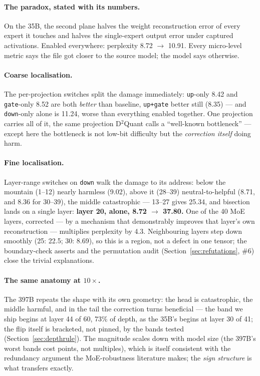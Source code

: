 \documentclass[10pt]{article} %
\begin{document}
\paragraph{The paradox, stated with its numbers.} On the 35B, the second plane halves
the weight reconstruction error of every expert it touches and halves the
single-expert output error under captured activations. Enabled everywhere:
perplexity 8.72 $\to$ 10.91. Every micro-level metric says the file got closer to
the source model; the model says otherwise.

\paragraph{Coarse localisation.} The per-projection switches split the damage
immediately: \texttt{up}-only 8.42 and \texttt{gate}-only 8.52 are both \emph{better} than
baseline, \texttt{up+gate} better still (8.35) --- and \texttt{down}-only alone is 11.24,
worse than everything enabled together. One projection carries all of it,
the same projection D$^2$Quant \citep{yan2026d2quant} calls a ``well-known bottleneck'' --- except here
the bottleneck is not low-bit difficulty but the \emph{correction itself} doing
harm.

\paragraph{Fine localisation.} Layer-range switches on \texttt{down} walk the damage to its
address: below the mountain (1--12) nearly harmless (9.02), above it (28--39)
neutral-to-helpful (8.71, and 8.36 for 30--39), the middle catastrophic ---
13--27 gives 25.34, and bisection lands on a single layer: \textbf{layer 20, alone,
8.72 $\to$ 37.80.} One of the 40 MoE layers, corrected --- by a mechanism that
demonstrably improves that layer's own reconstruction --- multiplies
perplexity by 4.3. Neighbouring layers step down smoothly (25: 22.5; 30:
8.69), so this is a region, not a defect in one tensor; the boundary-check
asserts and the permutation audit (Section~\ref{sec:refutations}, \#6) close the trivial
explanations.

\paragraph{The same anatomy at $10\times$.} The 397B repeats the shape with its own
geometry: the head is catastrophic, the middle harmful, and in the tail the
correction turns beneficial --- the band we ship begins at layer 44 of 60,
73\% of depth, as the 35B's begins at layer 30 of 41; the flip itself is
bracketed, not pinned, by the bands tested (Section~\ref{sec:depthrule}).
The magnitude scales down with model size (the 397B's
worst bands cost points, not multiples), which is itself consistent with the
redundancy argument the MoE-robustness literature makes; the \emph{sign
structure} is what transfers exactly.
\end{document}
